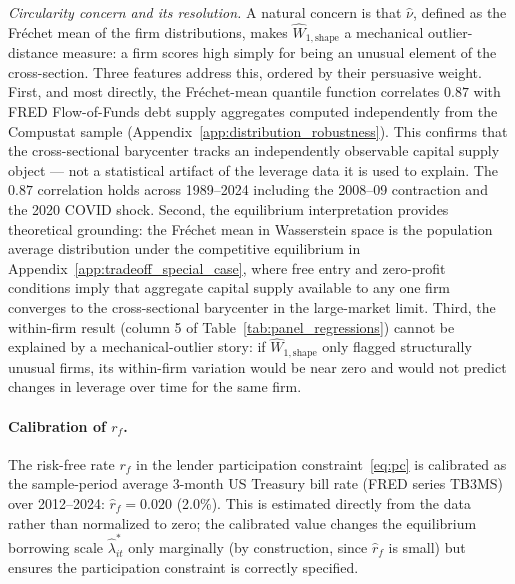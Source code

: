 \textit{Circularity concern and its resolution.} A natural concern is that $\hat{\nu}$, defined as the Fréchet mean of the firm distributions, makes $\widehat{W}_{1,\text{shape}}$ a mechanical outlier-distance measure: a firm scores high simply for being an unusual element of the cross-section. Three features address this, ordered by their persuasive weight. First, and most directly, the Fr\'{e}chet-mean quantile function correlates $0.87$ with FRED Flow-of-Funds debt supply aggregates computed independently from the Compustat sample (Appendix~\ref{app:distribution_robustness}). This confirms that the cross-sectional barycenter tracks an independently observable capital supply object — not a statistical artifact of the leverage data it is used to explain. The $0.87$ correlation holds across 1989--2024 including the 2008--09 contraction and the 2020 COVID shock. Second, the equilibrium interpretation provides theoretical grounding: the Fr\'{e}chet mean in Wasserstein space is the population average distribution under the competitive equilibrium in Appendix~\ref{app:tradeoff_special_case}, where free entry and zero-profit conditions imply that aggregate capital supply available to any one firm converges to the cross-sectional barycenter in the large-market limit. Third, the within-firm result (column 5 of Table~\ref{tab:panel_regressions}) cannot be explained by a mechanical-outlier story: if $\widehat{W}_{1,\text{shape}}$ only flagged structurally unusual firms, its within-firm variation would be near zero and would not predict changes in leverage over time for the same firm.

\paragraph{Calibration of $r_f$.}
The risk-free rate $r_f$ in the lender participation constraint~\eqref{eq:pc} is calibrated as the sample-period average 3-month US Treasury bill rate (FRED series TB3MS) over 2012--2024: $\hat{r}_f = 0.020$ (2.0\%). This is estimated directly from the data rather than normalized to zero; the calibrated value changes the equilibrium borrowing scale $\hat{\lambda}_{it}^*$ only marginally (by construction, since $\hat{r}_f$ is small) but ensures the participation constraint is correctly specified.

